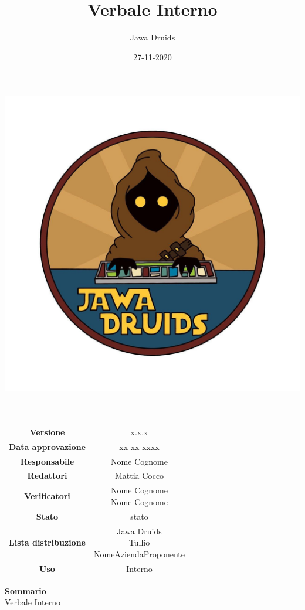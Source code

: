 \documentclass[a4paper,12pt]{report}
\begin{document}
	
	\makeatletter
	\begin{titlepage}
		\begin{center}
			\vspace*{-4,0cm}
			\author{Jawa Druids} 
			\title{Verbale Interno}
			\date{27-11-2020} %
			\includegraphics[width=0.7\linewidth]{../../immagini/DRUIDSLOGO.jpg}\\[4ex]
			{\huge \bfseries  \@title }\\[2ex] 
			{\LARGE  \@author}\\[50ex]
			\vspace*{-8,0cm}
			\begin{table}[H]
				\centering
				\begin{tabular}{c|c}
					\textbf{Versione} & x.x.x \\
					\textbf{Data approvazione} & xx-xx-xxxx\\
					\textbf{Responsabile} & Nome Cognome\\
					\textbf{Redattori} & Mattia Cocco \\
					\textbf{Verificatori} & \makecell{Nome Cognome \\ Nome Cognome} \\
					\textbf{Stato} & stato\\
					\textbf{Lista distribuzione} & \makecell{Jawa Druids \\ Tullio \\ NomeAziendaProponente}\\
					\textbf{Uso} & Interno            
				\end{tabular}
			\end{table}
			\fontsize{16}{10}\textbf{Sommario} \\
			Verbale Interno
		\end{center}
	\end{titlepage}
\end{document}
